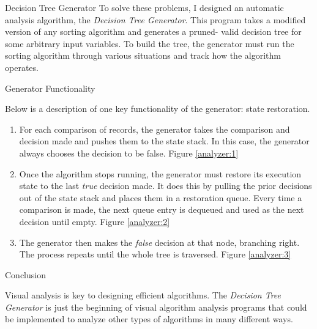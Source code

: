 \documentclass[final]{beamer}
\newlength{\onecolwid}
\begin{document}
\begin{frame}[t]
\begin{columns}[t]
\begin{column}{\onecolwid}
\begin{block}{Decision Tree Generator}
To solve these problems, I designed an automatic analysis algorithm, the \textit{Decision Tree
Generator}. This program takes a modified version of any sorting algorithm and generates a pruned-
valid decision tree for some arbitrary input variables. To build the tree, the generator must run
the sorting algorithm through various situations and track how the algorithm operates.

\end{block}


\begin{block}{Generator Functionality}

Below is a description of one key functionality of the generator: state restoration.

\begin{enumerate}
\item For each comparison of records, the generator takes the comparison and decision made and
	pushes them to the state stack. In this case, the generator always chooses the decision to be
	false. Figure \ref{analyzer:1}
\item Once the algorithm stops running, the generator must restore its execution state to the last
	\textit{true} decision made. It does this by pulling the prior decisions out of the state stack
	and places them in a restoration queue. Every time a comparison is made, the next queue entry is
	dequeued and used as the next decision until empty. Figure \ref{analyzer:2}
\item The generator then makes the \textit{false} decision at that node, branching right. The
	process repeats until the whole tree is traversed. Figure \ref{analyzer:3}
\end{enumerate}

\end{block}



\begin{block}{Conclusion}

Visual analysis is key to designing efficient algorithms. The \textit{Decision Tree Generator} is
just the beginning of visual algorithm analysis programs that could be implemented to analyze other
types of algorithms in many different ways.


\end{block}
\end{column}
\end{columns}
\end{frame}
\end{document}
